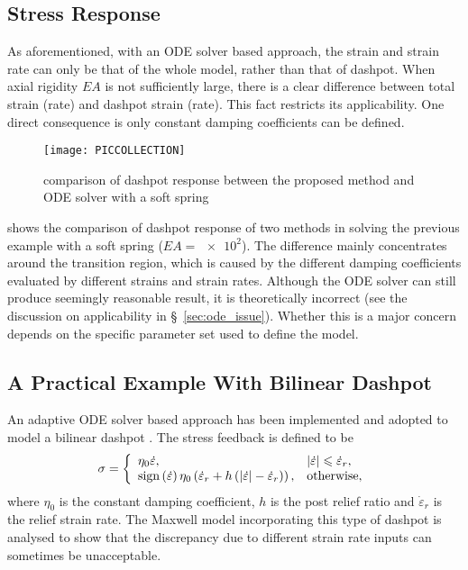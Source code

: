 \subsection{Stress Response}
As aforementioned, with an ODE solver based approach, the strain and strain rate can only be that of the whole model, rather than that of dashpot. When axial rigidity $EA$ is not sufficiently large, there is a clear difference between total strain (rate) and dashpot strain (rate). This fact restricts its applicability. One direct consequence is only constant damping coefficients can be defined.

\begin{figure}[htb]
\centering\scriptsize
\texttt{[image: PICCOLLECTION]}
\caption{comparison of dashpot response between the proposed method and ODE solver with a soft spring}\label{fig:two_method}
\end{figure}
 shows the comparison of dashpot response of two methods in solving the previous example with a soft spring ($EA=\num[print-unity-mantissa=false]{e2}$). The difference mainly concentrates around the transition region, which is caused by the different damping coefficients evaluated by different strains and strain rates. Although the ODE solver can still produce seemingly reasonable result, it is theoretically incorrect (see the discussion on applicability in \S~\ref{sec:ode_issue}). Whether this is a major concern depends on the specific parameter set used to define the model.
\subsection{A Practical Example With Bilinear Dashpot}
An adaptive ODE solver based approach has been implemented and adopted to model a bilinear dashpot \citep{Akcelyan2018}. The stress feedback is defined to be
\begin{gather}
\sigma=\left\{
\begin{array}{ll}
\eta_0\dot\varepsilon,&|\dot\varepsilon|\leqslant\dot\varepsilon_r,\\
\mathrm{sign}\left(\dot\varepsilon\right)\eta_0\left(\dot\varepsilon_r+h\left(|\dot\varepsilon|-\dot\varepsilon_r\right)\right),&\text{otherwise},
\end{array}\right.
\end{gather}
where $\eta_0$ is the constant damping coefficient, $h$ is the post relief ratio and $\dot\varepsilon_r$ is the relief strain rate. The Maxwell model incorporating this type of dashpot is analysed to show that the discrepancy due to different strain rate inputs can sometimes be unacceptable.

